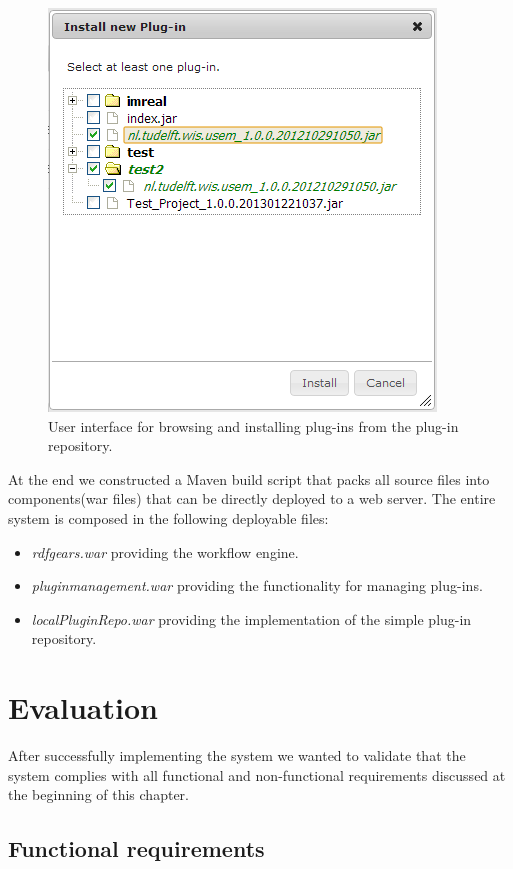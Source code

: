 \begin{figure}[h!]
  \centering
  	\includegraphics[scale=0.6]{plug-in/ui/repo.png}
  \caption{User interface for browsing and installing plug-ins from the plug-in repository.}
  \label{repo_ui}
\end{figure}

At the end we constructed a Maven build script that packs all source files into components(war files) that can be directly deployed to a web server. The entire system is composed in the following deployable files:
\begin{itemize}
	\item \textit{rdfgears.war} providing the workflow engine.
	\item \textit{pluginmanagement.war} providing the functionality for managing plug-ins.
	\item \textit{localPluginRepo.war} providing the implementation of the simple plug-in repository.
\end{itemize}

\section{Evaluation}
\label{sec:eval}

After successfully implementing the system we wanted to validate that the system complies with all functional and non-functional requirements discussed at the beginning of this chapter. 

\subsection{Functional requirements}


